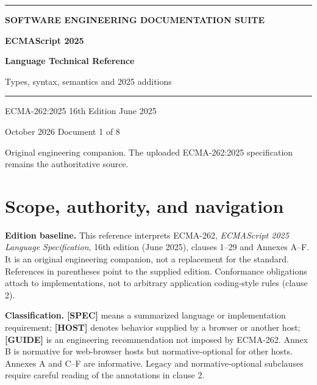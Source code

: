 \documentclass[11pt,letterpaper]{article}
\begin{document}
\hypersetup{pageanchor=false}%
\begin{titlepage}
\thispagestyle{empty}
\vspace*{2.8cm}
{\color{Gold}\rule{18mm}{3pt}}\par\vspace{18mm}
{\sffamily\Large\bfseries\color{Teal} SOFTWARE ENGINEERING DOCUMENTATION SUITE}\par
\vspace{8mm}
{\sffamily\huge\bfseries\color{DeepNavy} ECMAScript 2025 }\par
\vspace{4mm}
{\sffamily\fontsize{24}{29}\selectfont\bfseries\color{DeepNavy} Language Technical Reference }\par
\vspace{10mm}
{\large\color{Slate} Types, syntax, semantics and 2025 additions }\par
\vspace{16mm}
{\color{Teal}\rule{\textwidth}{0.8pt}}\par
\vfill
{\sffamily\color{Slate}\large ECMA-262:2025 \textbullet{} 16th Edition \textbullet{} June 2025}\par
\vspace{3mm}
{\sffamily\color{Slate} October 2026 \textbullet{} Document 1 of 8}\par
\vspace{3mm}
{\small\color{Slate} Original engineering companion. The uploaded ECMA-262:2025 specification remains the authoritative source.}\par
\end{titlepage}\hypersetup{pageanchor=true}
\tableofcontents
\clearpage
\section{Scope, authority, and navigation}\label{scope-authority-and-navigation}

\textbf{Edition baseline.} This reference interprets ECMA-262, \emph{ECMAScript 2025 Language Specification}, 16th edition (June 2025), clauses 1--29 and Annexes A--F. It is an original engineering companion, not a replacement for the standard. References in parentheses point to the supplied edition. Conformance obligations attach to implementations, not to arbitrary application coding-style rules (clause 2).

\textbf{Classification.} \textbf{{[}SPEC{]}} means a summarized language or implementation requirement; \textbf{{[}HOST{]}} denotes behavior supplied by a browser or another host; \textbf{{[}GUIDE{]}} is an engineering recommendation not imposed by ECMA-262. Annex B is normative for web-browser hosts but normative-optional for other hosts. Annexes A and C--F are informative. Legacy and normative-optional subclauses require careful reading of the annotations in clause 2.
\end{document}
